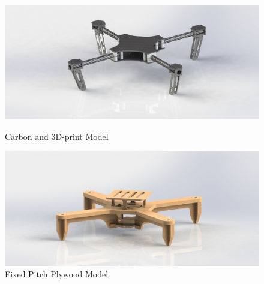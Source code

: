\begin{figure}[h]
        \centering
         \begin{minipage}[b]{0.45\textwidth}
            \includegraphics[width = \textwidth]{VAPIQ-PICTURES/FixedPitchConceptCarbon}
              \caption{Carbon and 3D-print Model}
            \label{fig:CarbonFPQ}
        \end{minipage}
        \hfill
        \begin{minipage}[b]{0.45\textwidth}
            \includegraphics[width = \textwidth]{VAPIQ-PICTURES/FixedPitchso2}
            \caption{Fixed Pitch Plywood Model}
            \label{fig:FPQply}
        \end{minipage}
\end{figure}


